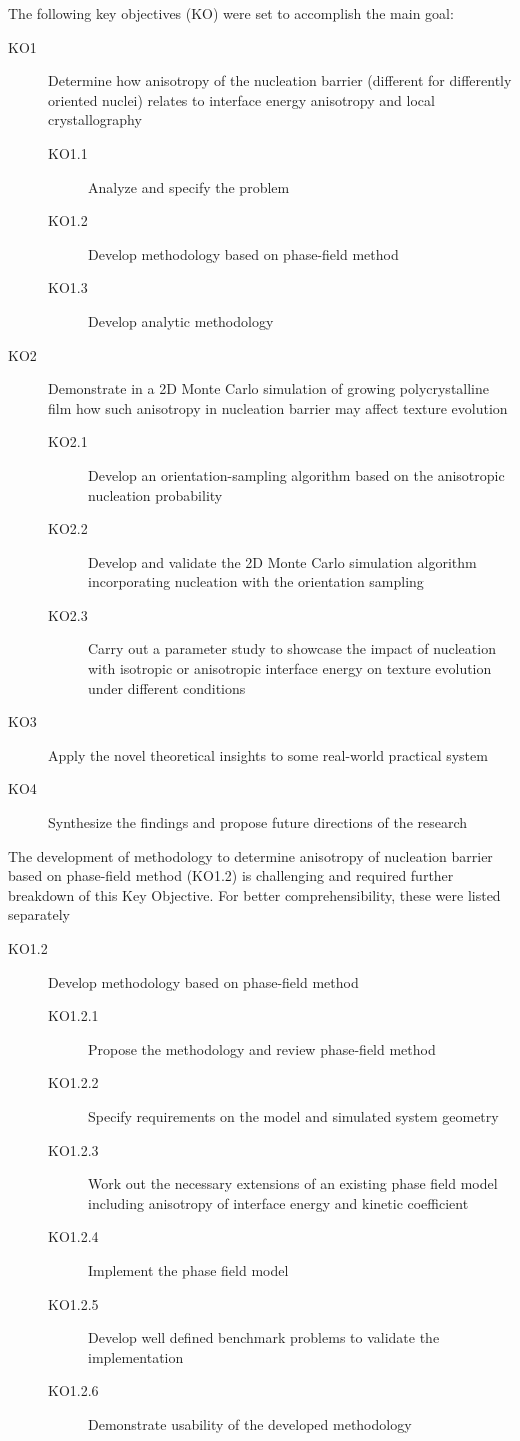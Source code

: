 The following key objectives (KO) were set to accomplish the main goal:
\begin{description}
	\item[KO1] Determine how anisotropy of the nucleation barrier (different for differently oriented nuclei) relates to interface energy anisotropy and local crystallography
	\begin{description}
		\item[KO1.1] Analyze and specify the problem
		\item[KO1.2] Develop methodology based on phase-field method
		\item[KO1.3] Develop analytic methodology
	\end{description}
	\item[KO2] Demonstrate in a 2D Monte Carlo simulation of growing polycrystalline film how such anisotropy in nucleation barrier may affect texture evolution
	\begin{description}
		\item[KO2.1] Develop an orientation-sampling algorithm based on the anisotropic nucleation probability
		\item[KO2.2] Develop and validate the 2D Monte Carlo simulation algorithm incorporating nucleation with the orientation sampling
		\item[KO2.3] Carry out a parameter study to showcase the impact of nucleation with isotropic or anisotropic interface energy on texture evolution under different conditions
	\end{description}
	\item[KO3] Apply the novel theoretical insights to some real-world practical system
	\item[KO4] Synthesize the findings and propose future directions of the research
\end{description}

The development of methodology to determine anisotropy of nucleation barrier based on phase-field method (KO1.2) is challenging and required further breakdown of this Key Objective. For better comprehensibility, these were listed separately

\begin{description}
	\item[KO1.2] Develop methodology based on phase-field method
	\begin{description}
		\item[KO1.2.1] Propose the methodology and review phase-field method
		\item[KO1.2.2] Specify requirements on the model and simulated system geometry
		\item[KO1.2.3] Work out the necessary extensions of an existing phase field model including anisotropy of interface energy and kinetic coefficient
		\item[KO1.2.4] Implement the phase field model 
		\item[KO1.2.5] Develop well defined benchmark problems to validate the implementation
		\item[KO1.2.6] Demonstrate usability of the developed methodology
	\end{description}
\end{description}

